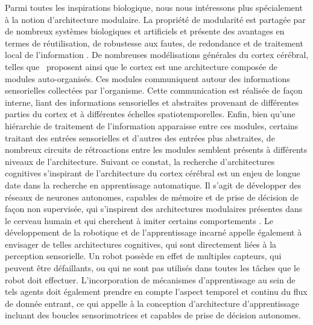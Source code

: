 Parmi toutes les inspirations biologique, nous nous intéressons plus spécialement à la notion d'architecture modulaire.
La propriété de modularité est partagée par de nombreux systèmes biologiques et artificiels et présente des avantages en termes de réutilisation, de robustesse aux fautes, de redondance et de traitement local de l'information \parencite{clune_evolutionary_2013}. De nombreuses modélisations générales du cortex cérébral, telles que~\cite{binzegger05, Meunier2009HierarchicalMI,sporns_structure_2013,betzel_multi-scale_2017} proposent ainsi que le cortex est une architecture composée de modules auto-organisés. Ces modules communiquent autour des informations sensorielles collectées par l'organisme. Cette communication est réalisée de façon interne, liant des informations sensorielles et abstraites provenant de différentes parties du cortex et à différentes échelles spatiotemporelles. Enfin, bien qu'une hiérarchie de traitement de l'information apparaisse entre ces modules, certains traitant des entrées sensorielles et d'autres des entrées plus abstraites, de nombreux circuits de rétroactions entre les modules semblent présents à différents niveaux de l'architecture.
Suivant ce constat, la recherche d'architectures cognitives s'inspirant de l'architecture du cortex cérébral est un enjeu de longue date dans la recherche en apprentissage automatique. Il s'agit de développer des réseaux de neurones autonomes, capables de mémoire et de prise de décision de façon non supervisée, qui s'inspirent des architectures modulaires présentes dans le cerveau humain et qui cherchent à imiter certains comportements \parencite{Kotseruba201840YO}. 
Le développement de la robotique et de l'apprentissage incarné appelle également à envisager de telles architectures cognitives, qui sont directement liées à la perception sensorielle.
Un robot possède en effet de multiples capteurs, qui peuvent être défaillants, ou qui ne sont pas utilisés dans toutes les tâches que le robot doit effectuer. L'incorporation de mécanismes d'apprentissage au sein de tels agents doit également prendre en compte l'aspect temporel et continu du flux de donnée entrant, ce qui appelle à la conception d'architecture d'apprentissage  incluant des boucles sensorimotrices et capables de prise de décision autonomes.



